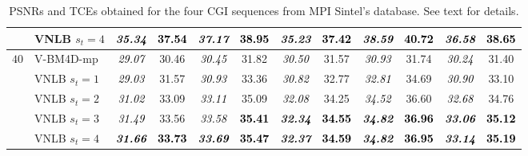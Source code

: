 \documentclass[10pt, journal, twocolumn, final, a4paper]{IEEEtran}
\newcommand{\bsic}[1]{\textcolor{black}{\textit{#1}}}
\newcommand{\Bsic}[1]{\textcolor{black}{\textbf{\textit{#1}}}}
\newcommand{\Best}[1]{\textbf{\textcolor{black}{#1}}}
\begin{document}
\begin{table}[htp!]
\begin{center}
{\begin{tabular}{ c | l |c c | c c | c c | c c | c c}
										 & VNLB   $s_t = 4$     & \Bsic{35.34} & \Best{37.54} & \Bsic{37.17} & \Best{38.95} & \Bsic{35.23} & \Best{37.42} & \Bsic{38.59} & \Best{40.72} & \Bsic{36.58} & \Best{38.65} \\\hline
%
			\multirow{1}{*}{$40$}
			                      & V-BM4D-mp            & \bsic{29.07} &       30.46  & \bsic{30.45} &       31.82  & \bsic{30.50} &       31.57  & \bsic{30.93} &       31.74  & \bsic{30.24} &       31.40  \\
			                      & VNLB   $s_t = 1$     & \bsic{29.03} &       31.57  & \bsic{30.93} &       33.36  & \bsic{30.82} &       32.77  & \bsic{32.81} &       34.69  & \bsic{30.90} &       33.10  \\
			                      & VNLB   $s_t = 2$     & \bsic{31.02} &       33.09  & \bsic{33.11} &       35.09  & \bsic{32.08} &       34.25  & \bsic{34.52} &       36.60  & \bsic{32.68} &       34.76  \\
										 & VNLB   $s_t = 3$     & \bsic{31.49} &       33.56  & \bsic{33.58} & \Best{35.41} & \Bsic{32.34} & \Best{34.55} & \Bsic{34.82} & \Best{36.96} & \Bsic{33.06} & \Best{35.12} \\
			                      & VNLB   $s_t = 4$     & \Bsic{31.66} & \Best{33.73} & \Bsic{33.69} & \Best{35.47} & \Bsic{32.37} & \Best{34.59} & \Bsic{34.82} & \Best{36.95} & \Bsic{33.14} & \Best{35.19} \\\hline
		\end{tabular}}
	\end{center}
	\caption{PSNRs and TCEs obtained for the four CGI sequences from MPI
	Sintel's database. See text for details.}
	\label{tab:sintel}
\end{table}
\end{document}
